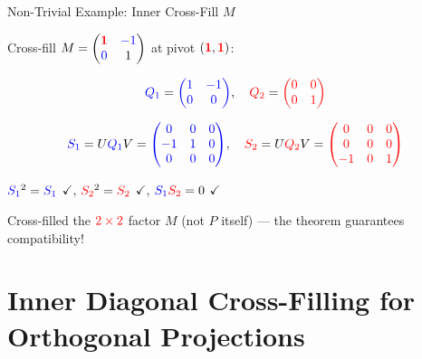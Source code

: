 \documentclass[10pt]{beamer}
\theoremstyle{definition}
\newcommand{\pvt}[1]{{\color{red}\mathbf{#1}}}       %
\newcommand{\crs}[1]{{\color{blue}#1}}                %
\newcommand{\rd}[1]{{\color{red}#1}}                  %
\newcommand{\bl}[1]{{\color{blue}#1}}                 %
\begin{document}
\begin{frame}{Non-Trivial Example: Inner Cross-Fill $M$}

Cross-fill $M = \begin{pmatrix} \pvt{1} & \crs{-1} \\ \crs{0} & 1 \end{pmatrix}$ at pivot $(\pvt{1},\pvt{1})$:

$$\bl{Q_1} = \bl{\begin{pmatrix} 1 & -1 \\ 0 & 0 \end{pmatrix}}, \quad \rd{Q_2} = \rd{\begin{pmatrix} 0 & 0 \\ 0 & 1 \end{pmatrix}}$$

\vspace{0.3em}

$$\bl{S_1} = U\bl{Q_1}V = \bl{\begin{pmatrix} 0 & 0 & 0 \\ -1 & 1 & 0 \\ 0 & 0 & 0 \end{pmatrix}}, \quad \rd{S_2} = U\rd{Q_2}V = \rd{\begin{pmatrix} 0 & 0 & 0 \\ 0 & 0 & 0 \\ -1 & 0 & 1 \end{pmatrix}}$$

\vspace{0.3em}

$\bl{S_1}^2 = \bl{S_1}$ $\checkmark$, \; $\rd{S_2}^2 = \rd{S_2}$ $\checkmark$, \; $\bl{S_1}\rd{S_2} = 0$ $\checkmark$

\vspace{0.3em}

Cross-filled the $\rd{2 \times 2}$ factor $M$ (not $P$ itself) --- the theorem guarantees compatibility!

\end{frame}



\section{Inner Diagonal Cross-Filling for Orthogonal Projections}
\end{document}
